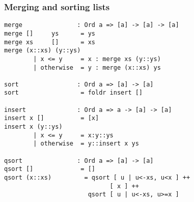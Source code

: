\subsubsection*{Merging and sorting lists}
\begin{verbatim}
merge               : Ord a => [a] -> [a] -> [a] 
merge []     ys      = ys
merge xs     []      = xs
merge (x::xs) (y::ys)
        | x <= y     = x : merge xs (y::ys)
        | otherwise  = y : merge (x::xs) ys

sort                : Ord a => [a] -> [a]
sort                 = foldr insert []

insert              : Ord a => a -> [a] -> [a]
insert x []          = [x]
insert x (y::ys)
        | x <= y     = x:y::ys
        | otherwise  = y::insert x ys

qsort               : Ord a => [a] -> [a]
qsort []             = []
qsort (x::xs)         = qsort [ u | u<-xs, u<x ] ++
                             [ x ] ++
                       qsort [ u | u<-xs, u>=x ]
\end{verbatim}

